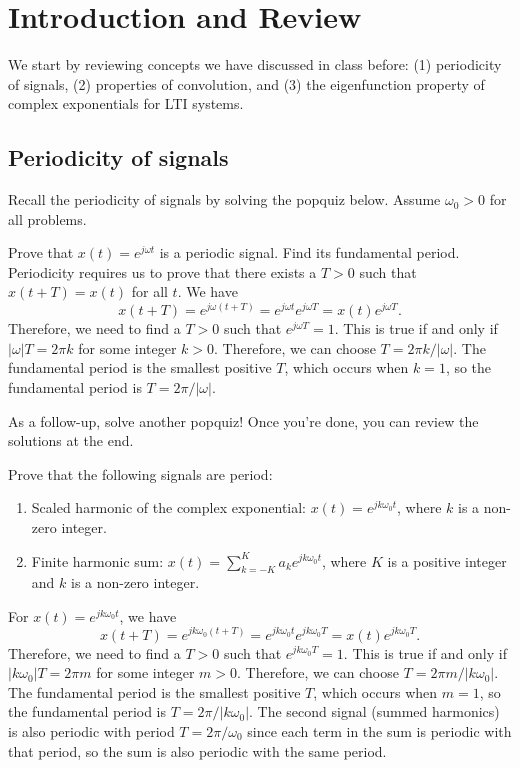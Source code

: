 
\section{Introduction and Review}
We start by reviewing concepts we have discussed in class before: (1) periodicity of signals, (2) properties of convolution, and (3) the eigenfunction property of complex exponentials for LTI systems. 
\subsection{Periodicity of signals}
Recall the periodicity of signals by solving the popquiz below. Assume $\omega_0>0$ for all problems.
\begin{popquiz}
  Prove that $x(t)=e^{j\omega t}$ is a periodic signal. Find its fundamental period.
  \popqsplit 
  Periodicity requires us to prove that there exists a $T>0$ such that $x(t+T)=x(t)$ for all $t$. We have
  \[
  x(t+T)=e^{j\omega (t+T)}=e^{j\omega t}e^{j\omega T}=x(t)e^{j\omega T}.
  \]
  Therefore, we need to find a $T>0$ such that $e^{j\omega T}=1$. This is true if and only if $|\omega|T=2\pi k$ for some integer $k>0$.
  Therefore, we can choose $T=2\pi k/|\omega|$. The fundamental period is the smallest positive $T$, which occurs when $k=1$, so the fundamental period is $T=2\pi/|\omega|$.
\end{popquiz}
As a follow-up, solve another popquiz! Once you're done, you can review the solutions at the end.
\begin{popquiz}
Prove that the following signals are period:
\begin{enumerate}
\item Scaled harmonic of the complex exponential: $x(t)=e^{jk\omega_0 t}$, where $k$ is a non-zero integer.
\item Finite harmonic sum: $x(t)=\sum_{k=-K}^{K}a_k e^{jk\omega_0t}$, where $K$ is a positive integer and $k$ is a non-zero integer.
\end{enumerate}
\popqsplit
For $x(t)=e^{jk\omega_0 t}$, we have
\[
x(t+T)=e^{jk\omega_0 (t+T)}=e^{jk\omega_0 t}e^{jk\omega_0 T}=x(t)e^{jk\omega_0 T}.
\]
Therefore, we need to find a $T>0$ such that $e^{jk\omega_0 T}=1$. This is true if and only if $|k\omega_0|T=2\pi m$ for some integer $m>0$. Therefore, we can choose $T=2\pi m/|k\omega_0|$. The fundamental period is the smallest positive $T$, which occurs when $m=1$, so the fundamental period is $T=2\pi/|k\omega_0|$. The second signal (summed harmonics) is also periodic with period $T=2\pi/\omega_0$ since each term in the sum is periodic with that period, so the sum is also periodic with the same period.
\end{popquiz}
